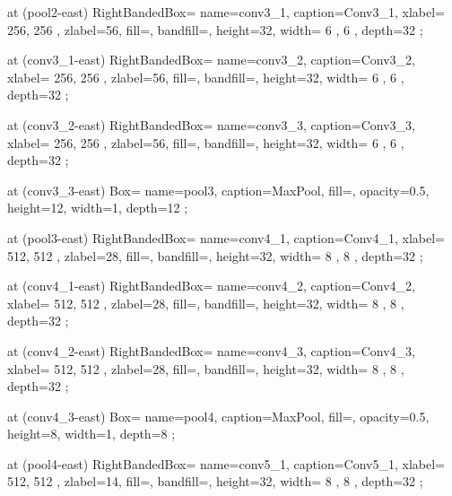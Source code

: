 \pic[shift={ (2,0,0) }] at (pool2-east) 
    {RightBandedBox={
        name=conv3_1,
        caption=Conv3_1,
        xlabel={{ 256, 256 }},
        zlabel=56,
        fill=\ConvColor,
        bandfill=\ConvReluColor,
        height=32,
        width={ 6 , 6 },
        depth=32
        }
    };

\pic[shift={ (1,0,0) }] at (conv3_1-east) 
    {RightBandedBox={
        name=conv3_2,
        caption=Conv3_2,
        xlabel={{ 256, 256 }},
        zlabel=56,
        fill=\ConvColor,
        bandfill=\ConvReluColor,
        height=32,
        width={ 6 , 6 },
        depth=32
        }
    };

\pic[shift={ (1,0,0) }] at (conv3_2-east) 
    {RightBandedBox={
        name=conv3_3,
        caption=Conv3_3,
        xlabel={{ 256, 256 }},
        zlabel=56,
        fill=\ConvColor,
        bandfill=\ConvReluColor,
        height=32,
        width={ 6 , 6 },
        depth=32
        }
    };

\pic[shift={ (0,0,0) }] at (conv3_3-east) 
    {Box={
        name=pool3,
        caption=MaxPool,
        fill=\PoolColor,
        opacity=0.5,
        height=12,
        width=1,
        depth=12
        }
    };

\pic[shift={ (2,0,0) }] at (pool3-east) 
    {RightBandedBox={
        name=conv4_1,
        caption=Conv4_1,
        xlabel={{ 512, 512 }},
        zlabel=28,
        fill=\ConvColor,
        bandfill=\ConvReluColor,
        height=32,
        width={ 8 , 8 },
        depth=32
        }
    };

\pic[shift={ (1,0,0) }] at (conv4_1-east) 
    {RightBandedBox={
        name=conv4_2,
        caption=Conv4_2,
        xlabel={{ 512, 512 }},
        zlabel=28,
        fill=\ConvColor,
        bandfill=\ConvReluColor,
        height=32,
        width={ 8 , 8 },
        depth=32
        }
    };

\pic[shift={ (1,0,0) }] at (conv4_2-east) 
    {RightBandedBox={
        name=conv4_3,
        caption=Conv4_3,
        xlabel={{ 512, 512 }},
        zlabel=28,
        fill=\ConvColor,
        bandfill=\ConvReluColor,
        height=32,
        width={ 8 , 8 },
        depth=32
        }
    };

\pic[shift={ (0,0,0) }] at (conv4_3-east) 
    {Box={
        name=pool4,
        caption=MaxPool,
        fill=\PoolColor,
        opacity=0.5,
        height=8,
        width=1,
        depth=8
        }
    };

\pic[shift={ (2,0,0) }] at (pool4-east) 
    {RightBandedBox={
        name=conv5_1,
        caption=Conv5_1,
        xlabel={{ 512, 512 }},
        zlabel=14,
        fill=\ConvColor,
        bandfill=\ConvReluColor,
        height=32,
        width={ 8 , 8 },
        depth=32
        }
    };

